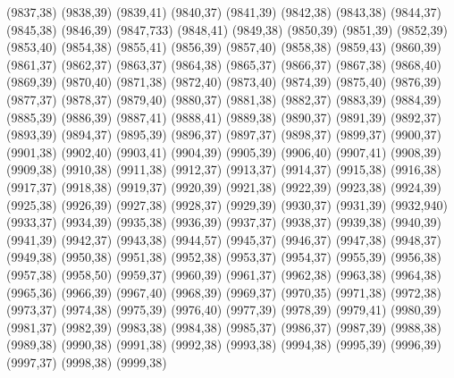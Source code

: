(9837,38)
(9838,39)
(9839,41)
(9840,37)
(9841,39)
(9842,38)
(9843,38)
(9844,37)
(9845,38)
(9846,39)
(9847,733)
(9848,41)
(9849,38)
(9850,39)
(9851,39)
(9852,39)
(9853,40)
(9854,38)
(9855,41)
(9856,39)
(9857,40)
(9858,38)
(9859,43)
(9860,39)
(9861,37)
(9862,37)
(9863,37)
(9864,38)
(9865,37)
(9866,37)
(9867,38)
(9868,40)
(9869,39)
(9870,40)
(9871,38)
(9872,40)
(9873,40)
(9874,39)
(9875,40)
(9876,39)
(9877,37)
(9878,37)
(9879,40)
(9880,37)
(9881,38)
(9882,37)
(9883,39)
(9884,39)
(9885,39)
(9886,39)
(9887,41)
(9888,41)
(9889,38)
(9890,37)
(9891,39)
(9892,37)
(9893,39)
(9894,37)
(9895,39)
(9896,37)
(9897,37)
(9898,37)
(9899,37)
(9900,37)
(9901,38)
(9902,40)
(9903,41)
(9904,39)
(9905,39)
(9906,40)
(9907,41)
(9908,39)
(9909,38)
(9910,38)
(9911,38)
(9912,37)
(9913,37)
(9914,37)
(9915,38)
(9916,38)
(9917,37)
(9918,38)
(9919,37)
(9920,39)
(9921,38)
(9922,39)
(9923,38)
(9924,39)
(9925,38)
(9926,39)
(9927,38)
(9928,37)
(9929,39)
(9930,37)
(9931,39)
(9932,940)
(9933,37)
(9934,39)
(9935,38)
(9936,39)
(9937,37)
(9938,37)
(9939,38)
(9940,39)
(9941,39)
(9942,37)
(9943,38)
(9944,57)
(9945,37)
(9946,37)
(9947,38)
(9948,37)
(9949,38)
(9950,38)
(9951,38)
(9952,38)
(9953,37)
(9954,37)
(9955,39)
(9956,38)
(9957,38)
(9958,50)
(9959,37)
(9960,39)
(9961,37)
(9962,38)
(9963,38)
(9964,38)
(9965,36)
(9966,39)
(9967,40)
(9968,39)
(9969,37)
(9970,35)
(9971,38)
(9972,38)
(9973,37)
(9974,38)
(9975,39)
(9976,40)
(9977,39)
(9978,39)
(9979,41)
(9980,39)
(9981,37)
(9982,39)
(9983,38)
(9984,38)
(9985,37)
(9986,37)
(9987,39)
(9988,38)
(9989,38)
(9990,38)
(9991,38)
(9992,38)
(9993,38)
(9994,38)
(9995,39)
(9996,39)
(9997,37)
(9998,38)
(9999,38)
